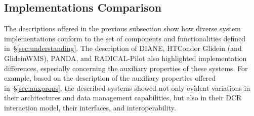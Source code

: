 \documentclass{sig-alternate}
\begin{document}
%
\subsection{Implementations Comparison}
\label{sec:context}





The descriptions offered in the previous subsection show how diverse \pilot
system implementations conform to the set of components and functionalities
defined in~\S\ref{sec:understanding}.  The description of DIANE, HTCondor
Glidein (and GlideinWMS), PANDA, and RADICAL-Pilot also highlighted
implementation differences, especially concerning the auxiliary properties of
these \pilot systems. For example, based on the description of the auxiliary
properties offered in~\S\ref{sec:auxprops}, the described \pilot systems showed
not only evident variations in their architectures and data management
capabilities, but also in their DCR interaction model, their interfaces, and
interoperability.
\end{document}
